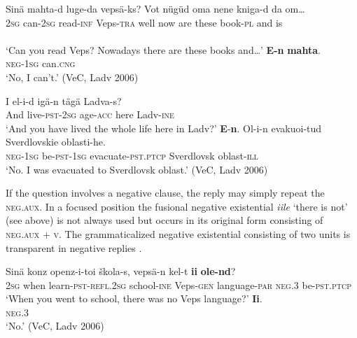 \documentclass[output=paper,colorlinks=true, citecolor=brown]{langscibook}
\begin{document}
\ea\label{ex:vep:54}
    \begin{xlist}[Q: ]
    \label{ex:vep:54A}
        \gll Sinä mahta-d luge-da vepsä-ks? Vot nügüd oma nene kniga-d da om… \\
        \textsc{2sg} can-\textsc{2sg} read\textsc{{}-inf} Veps{}-\textsc{tra} well now are these book{}-\textsc{pl} and is \\ 
              \\ 
        \glt ‘Can you read Veps? Nowadays there are these books and…’
    \label{ex:vep:54B}
        \gll  \textbf{E-n} \textbf{mahta}.\\ 
              \textsc{neg-1sg} can.\textsc{cng}\\
        \glt ‘No, I can’t.’ (VeC, Ladv 2006)
    \end{xlist}
\z

\ea\label{ex:vep:55}
    \begin{xlist}[Q: ]
    \label{ex:vep:55A}
        \gll  I el-i-d igä-n tägä Ladva-s?\\ 
              And live-\textsc{pst}{}-\textsc{2sg} age-\textsc{acc} here Ladv{}-\textsc{ine}\\ 
        \glt ‘And you have lived the whole life here in Ladv?’
    \label{ex:vep:55B}
        \gll  \textbf{E\-}{}-\textbf{n}. Ol{}-i{}-n evakuoi{}-tud  Sverdlovskie oblasti{}-he.\\ 
               \textsc{neg-1sg} be-\textsc{pst}{}-\textsc{1sg} evacuate-\textsc{pst.ptcp} Sverdlovsk oblast{}-\textsc{ill}\\
        \glt ‘No. I was evacuated to Sverdlovsk oblast.’ (VeC, Ladv 2006)
    \end{xlist}
\z 

If the question involves a negative clause, the reply may simply repeat the \textsc{neg}.\textsc{aux}. In a focused position the fusional negative existential \textit{iile} ‘there is not’ (see  above) is not always used but occurs in its original form consisting of \textsc{neg}.\textsc{aux} \textsc{+} \textsc{v}. 
The grammaticalized negative existential consisting of two units is transparent in negative replies .


\ea\label{ex:vep:56}
    \begin{xlist}[Q: ]
    \label{ex:vep:56A}
        \gll  Sinä konz openz{}-i{}-toi  škola{}-s, vepsä{}-n kel{}-t  \textbf{ii} \textbf{ole-nd}?\\ 
              \textsc{2sg} when learn-\textsc{pst-refl.2sg} school{}-\textsc{ine} Veps\textsc{{}-gen} language-\textsc{par} \textsc{neg.3} be-\textsc{pst.ptcp}\\ 
        \glt ‘When you went to school, there was no Veps language?’
    \label{ex:vep:56B}
        \gll  \textbf{Ii}.\\ 
               \textsc{neg.3}\\
        \glt ‘No.’ (VeC, Ladv 2006)
    \end{xlist}
\z 
\end{document}

